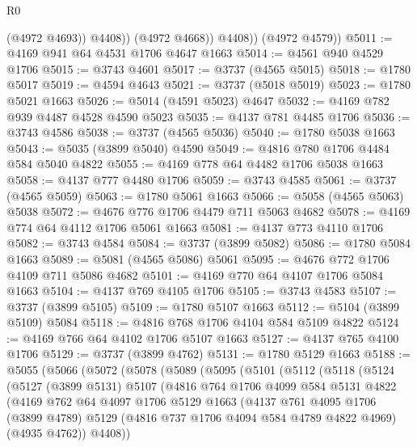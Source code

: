 \begin{lexlean}{R0}
\begin{coremodule}
                  (@4972 @4693))
                @4408))
            (@4972 @4668))
          @4408))
      (@4972 @4579))
@5011 := @4169 @941 @64 @4531 @1706 @4647 @1663
@5014 := @4561 @940 @4529 @1706
@5015 := @3743 @4601
@5017 := @3737 (@4565 @5015)
@5018 := @1780 @5017
@5019 := @4594 @4643
@5021 := @3737 (@5018 @5019)
@5023 := @1780 @5021 @1663
@5026 := @5014 (@4591 @5023) @4647
@5032 := @4169 @782 @939 @4487 @4528 @4590 @5023
@5035 := @4137 @781 @4485 @1706
@5036 := @3743 @4586
@5038 := @3737 (@4565 @5036)
@5040 := @1780 @5038 @1663
@5043 := @5035 (@3899 @5040) @4590
@5049 := @4816 @780 @1706 @4484 @584 @5040 @4822
@5055 := @4169 @778 @64 @4482 @1706 @5038 @1663
@5058 := @4137 @777 @4480 @1706
@5059 := @3743 @4585
@5061 := @3737 (@4565 @5059)
@5063 := @1780 @5061 @1663
@5066 := @5058 (@4565 @5063) @5038
@5072 := @4676 @776 @1706 @4479 @711 @5063 @4682
@5078 := @4169 @774 @64 @4112 @1706 @5061 @1663
@5081 := @4137 @773 @4110 @1706
@5082 := @3743 @4584
@5084 := @3737 (@3899 @5082)
@5086 := @1780 @5084 @1663
@5089 := @5081 (@4565 @5086) @5061
@5095 := @4676 @772 @1706 @4109 @711 @5086 @4682
@5101 := @4169 @770 @64 @4107 @1706 @5084 @1663
@5104 := @4137 @769 @4105 @1706
@5105 := @3743 @4583
@5107 := @3737 (@3899 @5105)
@5109 := @1780 @5107 @1663
@5112 := @5104 (@3899 @5109) @5084
@5118 := @4816 @768 @1706 @4104 @584 @5109 @4822
@5124 := @4169 @766 @64 @4102 @1706 @5107 @1663
@5127 := @4137 @765 @4100 @1706
@5129 := @3737 (@3899 @4762)
@5131 := @1780 @5129 @1663
@5188 := @5055
    (@5066
      (@5072
        (@5078
          (@5089
            (@5095
              (@5101
                (@5112
                  (@5118
                    (@5124
                      (@5127
                        (@3899 @5131)
                        @5107
                        (@4816
                          @764
                          @1706
                          @4099
                          @584
                          @5131
                          @4822
                          (@4169
                            @762
                            @64
                            @4097
                            @1706
                            @5129
                            @1663
                            (@4137
                              @761
                              @4095
                              @1706
                              (@3899 @4789)
                              @5129
                              (@4816 @737 @1706 @4094 @584 @4789 @4822 @4969)
                              (@4935 @4762))
                            @4408))

\end{coremodule}
\end{lexlean}
